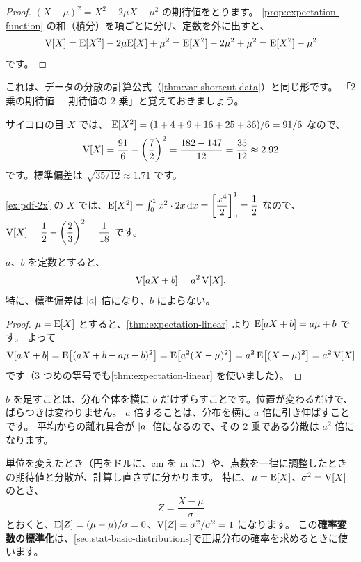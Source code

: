 \begin{proof}
  $(X - \mu)^2 = X^2 - 2\mu X + \mu^2$ の期待値をとります。
  \cref{prop:expectation-function} の和（積分）を項ごとに分け、定数を外に出すと、
  \[
    \mathrm{V}[X] = \mathrm{E}[X^2] - 2\mu\mathrm{E}[X] + \mu^2 = \mathrm{E}[X^2] - 2\mu^2 + \mu^2 = \mathrm{E}[X^2] - \mu^2
  \]
  です。
\end{proof}

これは、データの分散の計算公式（\cref{thm:var-shortcut-data}）と同じ形です。
「2 乗の期待値 $-$ 期待値の 2 乗」と覚えておきましょう。

\begin{example}
  サイコロの目 $X$ では、
  $\mathrm{E}[X^2] = (1 + 4 + 9 + 16 + 25 + 36)/6 = 91/6$ なので、
  \[
    \mathrm{V}[X] = \frac{91}{6} - \left(\frac{7}{2}\right)^2 = \frac{182 - 147}{12} = \frac{35}{12} \approx 2.92
  \]
  です。標準偏差は $\sqrt{35/12} \approx 1.71$ です。
\end{example}

\begin{example}[$f(x) = 2x$ の分散][ex:variance-2x]
  \cref{ex:pdf-2x} の $X$ では、$\mathrm{E}[X^2] = \int_0^1 x^2 \cdot 2x \mathop{}\!\mathrm{d} x = \left[\dfrac{x^4}{2}\right]_0^1 = \dfrac{1}{2}$ なので、
  $\mathrm{V}[X] = \dfrac{1}{2} - \left(\dfrac{2}{3}\right)^2 = \dfrac{1}{18}$ です。
\end{example}

\begin{theorem}
  $a$、$b$ を定数とすると、
  \[
    \mathrm{V}[aX + b] = a^2\, \mathrm{V}[X].
  \]
  特に、標準偏差は $\lvert a\rvert$ 倍になり、$b$ によらない。
\end{theorem}

\begin{proof}
  $\mu = \mathrm{E}[X]$ とすると、\cref{thm:expectation-linear} より $\mathrm{E}[aX + b] = a\mu + b$ です。
  よって
  \[
    \mathrm{V}[aX + b] = \mathrm{E}\bigl[(aX + b - a\mu - b)^2\bigr] = \mathrm{E}\bigl[a^2 (X - \mu)^2\bigr] = a^2\, \mathrm{E}\bigl[(X - \mu)^2\bigr] = a^2\, \mathrm{V}[X]
  \]
  です（3 つめの等号でも\cref{thm:expectation-linear} を使いました）。
\end{proof}

\begin{intuition}
  $b$ を足すことは、分布全体を横に $b$ だけずらすことです。位置が変わるだけで、ばらつきは変わりません。
  $a$ 倍することは、分布を横に $a$ 倍に引き伸ばすことです。
  平均からの離れ具合が $\lvert a\rvert$ 倍になるので、その 2 乗である分散は $a^2$ 倍になります。
\end{intuition}

\begin{merit}
  単位を変えたとき（円をドルに、cm を m に）や、点数を一律に調整したときの期待値と分散が、計算し直さずに分かります。
  特に、$\mu = \mathrm{E}[X]$、$\sigma^2 = \mathrm{V}[X]$ のとき、
  \[
    Z = \frac{X - \mu}{\sigma}
  \]
  とおくと、$\mathrm{E}[Z] = (\mu - \mu)/\sigma = 0$、$\mathrm{V}[Z] = \sigma^2/\sigma^2 = 1$ になります。
  この\textbf{確率変数の標準化}は、\cref{sec:stat-basic-distributions}で正規分布の確率を求めるときに使います。
\end{merit}

